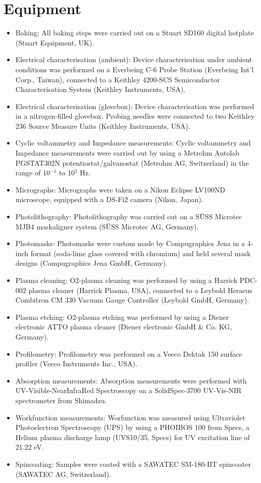 \section{Equipment}
\begin{itemize}
\item Baking: All baking steps were carried out on a Stuart SD160 digital hotplate (Stuart Equipment, UK). 
\item Electrical characterisation (ambient): Device characterisation under ambient conditions was performed on a Everbeing C-6 Probe Station (Everbeing Int’l Corp., Taiwan), connected to a Keithley 4200-SCS Semiconductor Characterisation System (Keithley Instruments, USA). 
\item Electrical characterisation (glovebox): Device characterisation was performed in a nitrogen-filled glovebox. Probing needles were connected to two Keithley 236 Source Measure Units (Keithley Instruments, USA). 
\item Cyclic voltammetry and Impedance measurements: Cyclic voltammetry and Impedance measurements were carried out by using a Metrohm Autolab PGSTAT302N potentiostat/galvanostat (Metrohm AG, Switzerland) in the range of 10$^{-1}$ to 10$^{5}$ Hz. 
\item Micrographs: Micrographs were taken on a Nikon Eclipse LV100ND microscope, equipped with a DS-Fi2 camera (Nikon, Japan). 
\item Photolithography: Photolithography was carried out on a SÜSS Microtec MJB4 maskaligner system (SÜSS Microtec AG, Germany). 
\item Photomasks: Photomasks were custom made by Compugraphics Jena in a 4-inch format (soda-lime glass covered with chromium) and held several mask designs (Compugraphics Jena GmbH, Germany). 
\item Plasma cleaning: O2-plasma cleaning was performed by using a Harrick PDC-002 plasma cleaner (Harrick Plasma, USA), connected to a Leybold Heraeus Combitron CM 330 Vacuum Gauge Controller (Leybold GmbH, Germany). 
\item Plasma etching: O2-plasma etching was performed by using a Diener electronic ATTO plasma cleaner (Diener electronic GmbH \& Co. KG, Germany). 
\item Profilometry: Profilometry was performed on a Veeco Dektak 150 surface profiler (Veeco Instruments Inc., USA).
\item Absorption measurements: Absorption measurements were performed with UV-Visible-NearInfraRed Spectroscopy on a SolidSpec-3700 UV-Vis-NIR spectrometer from Shimadzu.
\item Workfunction measurements: Worfunction was measured using Ultraviolet Photoelectron Spectroscopy (UPS) by using a PHOIBOS 100 from Specs, a Helium plasma discharge lamp (UVS10/35, Specs) for UV excitation line of 21.22 eV.
\item Spincoating: Samples were coated with a SAWATEC SM-180-BT spincoater (SAWATEC AG, Switzerland).
\end{itemize}

